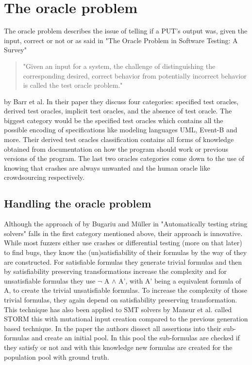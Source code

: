 \section{The oracle problem}
The oracle problem describes the issue of telling if a PUT's output was, given the input, correct or not or as said in "The Oracle Problem in Software Testing: A Survey"\cite{10barr2014oracleProblem} 
\begin{quote}
	"Given an input for a system, the challenge of distinguishing the corresponding desired, correct behavior from potentially incorrect behavior is called the test oracle problem."
\end{quote} by Barr et al.
In their paper they discuss four categories: specified test oracles, derived test oracles, implicit test oracles, and the absence of test oracle. The biggest category would be the specified test oracles which contains all the possible encoding of specifications like modeling languages UML, Event-B and more. Their derived test oracles classification contains all forms of knowledge obtained from documentation on how the program should work or previous versions of the program. The last two oracles categories come down to the use of knowing that crashes are always unwanted and the human oracle like crowdsourcing respectively.

\subsection{Handling the oracle problem}
Although the approach of by Bugariu and M\"uller in "Automatically testing string solvers"\cite{9bugariu2020automaticallyTestingStringSolvers} falls in the first category mentioned above, their approach is innovative. While most fuzzers either use crashes or differential testing (more on that later) to find bugs, they know the  (un)satisfiability of their formulas by the way of they are constructed. For satisfiable formulas they generate trivial formulas and then by satisfiability preserving transformations increase the complexity and for unsatisfiable formulas they use $\neg$ A $\land$ A', with A' being a equivalent formula of A, to create the trivial unsatisfiable formulas. To increase the complexity of those trivial formulas, they again depend on satisfiability preserving transformation. This technique has also been applied to SMT solvers by Mansur et al. called STORM\cite{1mansur2020detecting} this with mutational input creation compared to the previous generation based technique. In the paper the authors dissect all assertions into their sub-formulas and create an initial pool. In this pool the sub-formulas are checked if they satisfy or not and with this knowledge new formulas are created for the population pool with ground truth.

